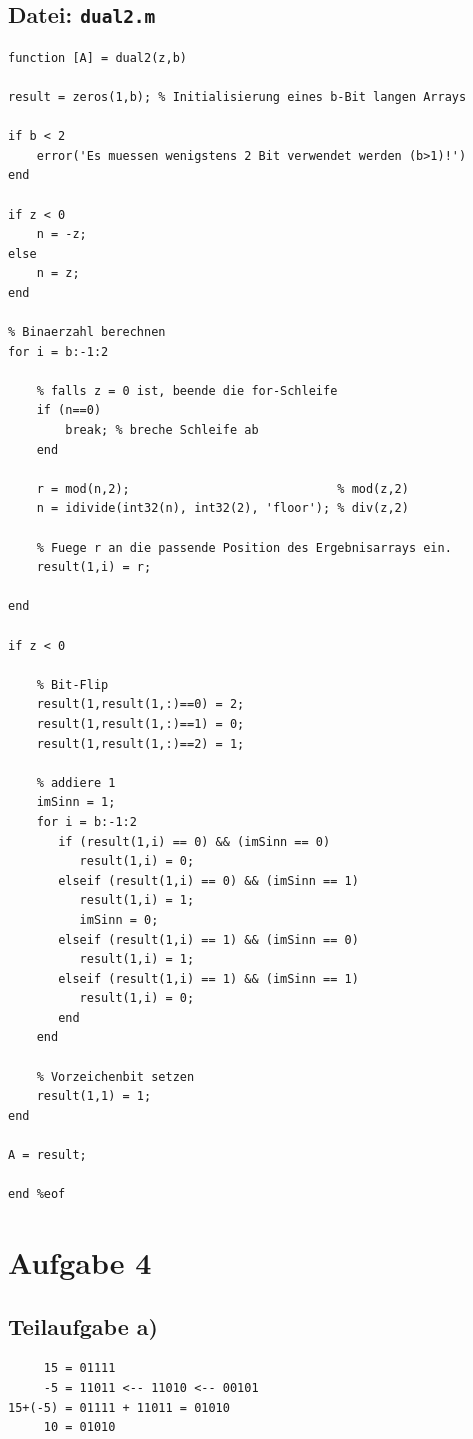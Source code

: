 \documentclass{llncs}
\begin{document}
\subsection*{Datei: \texttt{dual2.m}}
\begin{verbatim}
function [A] = dual2(z,b)

result = zeros(1,b); % Initialisierung eines b-Bit langen Arrays

if b < 2
    error('Es muessen wenigstens 2 Bit verwendet werden (b>1)!')
end

if z < 0
    n = -z;
else
    n = z;
end

% Binaerzahl berechnen
for i = b:-1:2

    % falls z = 0 ist, beende die for-Schleife
    if (n==0)
        break; % breche Schleife ab
    end
    
    r = mod(n,2);                             % mod(z,2)
    n = idivide(int32(n), int32(2), 'floor'); % div(z,2)
    
    % Fuege r an die passende Position des Ergebnisarrays ein.
    result(1,i) = r; 
 
end

if z < 0

    % Bit-Flip
    result(1,result(1,:)==0) = 2;
    result(1,result(1,:)==1) = 0;
    result(1,result(1,:)==2) = 1;

    % addiere 1
    imSinn = 1;
    for i = b:-1:2
       if (result(1,i) == 0) && (imSinn == 0)
          result(1,i) = 0;
       elseif (result(1,i) == 0) && (imSinn == 1)
          result(1,i) = 1;
          imSinn = 0;
       elseif (result(1,i) == 1) && (imSinn == 0)
          result(1,i) = 1;
       elseif (result(1,i) == 1) && (imSinn == 1)
          result(1,i) = 0;
       end
    end
    
    % Vorzeichenbit setzen
    result(1,1) = 1;
end

A = result;

end %eof
\end{verbatim}
\newpage


\section*{Aufgabe 4}

\subsection*{Teilaufgabe a)}

\begin{verbatim}
     15 = 01111
     -5 = 11011 <-- 11010 <-- 00101
15+(-5) = 01111 + 11011 = 01010
     10 = 01010
\end{verbatim}
\end{document}
